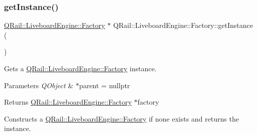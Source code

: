 \mbox{\label{classQRail_1_1LiveboardEngine_1_1Factory_a08e37a6538aad6341edf7066f10a63c7}} 
\subsubsection{\texorpdfstring{getInstance()}{getInstance()}}
{\footnotesize\ttfamily \mbox{\hyperlink{classQRail_1_1LiveboardEngine_1_1Factory}{Q\+Rail\+::\+Liveboard\+Engine\+::\+Factory}} $\ast$ Q\+Rail\+::\+Liveboard\+Engine\+::\+Factory\+::get\+Instance (\begin{DoxyParamCaption}{ }\end{DoxyParamCaption})\hspace{0.3cm}{\ttfamily [static]}}



Gets a \mbox{\hyperlink{classQRail_1_1LiveboardEngine_1_1Factory}{Q\+Rail\+::\+Liveboard\+Engine\+::\+Factory}} instance. 


\begin{DoxyParams}{Parameters}
{\em Q\+Object} & $\ast$parent = nullptr \\
\hline
\end{DoxyParams}
\begin{DoxyReturn}{Returns}
\mbox{\hyperlink{classQRail_1_1LiveboardEngine_1_1Factory}{Q\+Rail\+::\+Liveboard\+Engine\+::\+Factory}} $\ast$factory
\end{DoxyReturn}
Constructs a \mbox{\hyperlink{classQRail_1_1LiveboardEngine_1_1Factory}{Q\+Rail\+::\+Liveboard\+Engine\+::\+Factory}} if none exists and returns the instance. \mbox{\label{classQRail_1_1LiveboardEngine_1_1Factory_adc3e3cb8c87171641f33f77367074a02}} 
